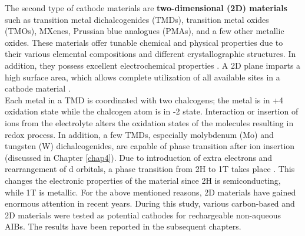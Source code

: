 The second type of cathode materials are \textbf{two-dimensional (2D) materials} such as transition metal dichalcogenides (TMDs), transition metal oxides (TMOs), MXenes, Prussian blue analogues (PMAs), and a few other metallic oxides. These materials offer tunable chemical and physical properties due to their various elemental compositions and different crystallographic structures. In addition, they possess excellent electrochemical properties \cite{chia_electrochemistry_2015}. A 2D plane imparts a high surface area, which allows complete utilization of all available sites in a cathode material \cite{jia_interfacial_2016,naguib_mxene_2012}.\\ Each metal in a TMD is coordinated with two chalcogens; the metal is in +4 oxidation state while the chalcogen atom is in -2 state. Interaction or insertion of ions from the electrolyte alters the oxidation states of the molecules resulting in redox process. In addition, a few TMDs, especially molybdenum (Mo) and tungsten (W) dichalcogenides, are capable of phase transition after ion insertion (discussed in Chapter \ref{chap4}). Due to introduction of extra electrons and rearrangement of d orbitals, a phase transition from 2H to 1T takes place \cite{acerce_metallic_2015}. This changes the electronic properties of the material since 2H  is semiconducting, while 1T  is metallic. For the above mentioned reasons, 2D materials have gained enormous attention in recent years. 
During this study, various carbon-based and 2D materials were tested as potential cathodes for rechargeable non-aqueous AIBs. The results have been reported in the subsequent chapters.

